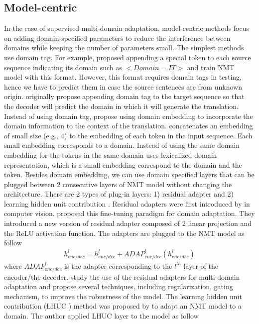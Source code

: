 \subsection{Model-centric}
In the case of supervised multi-domain adaptation, model-centric methods focus on adding domain-specified parameters to reduce the interference between domains while keeping the number of parameters small. The simplest methods use domain tag. For example, \citet{Kobus17domain} proposed appending a special token to each source sequence indicating its domain such as $<Domain=IT>$ and train NMT model with this format. However, this format requires domain tags in testing, hence we have to predict them in case the source sentences are from unknown origin. \cite{Britz17effective} originally propose appending domain tag to the target sequence so that the decoder will predict the domain in which it will generate the translation. Instead of using domain tag, \citep{Kobus17domain, Pham19generic} propose using domain embedding to incorporate the domain information to the context of the translation. \citet{Kobus17domain} concatenates an embedding of small size (e.g., 4) to the embedding of each token in the input sequence. Each small embedding corresponds to a domain. Instead of using the same domain embedding for the tokens in the same domain \citet{Pham19generic} uses lexicalized domain representation, which is a small embedding correspond to the domain and the token. Besides domain embedding, we can use domain specified layers that can be plugged between 2 consecutive layers of NMT model without changing the architecture. There are 2 types of plug-in layers: 1) residual adapter \citep{Bapna19simple, Pham20Study} and 2) learning hidden unit contribution \citep{Vilar18learning}. Residual adapters were first introduced by \citet{Rebuffi17learning} in computer vision. \citet{Bapna19simple} proposed this fine-tuning paradigm for domain adaptation. They introduced a new version of residual adapter composed of 2 linear projection and the ReLU activation function. The adapters are plugged to the NMT model as follow
\begin{equation}
\begin{array}{rcl}
h_{enc/dec}^l = h_{enc/dec}^{l} + ADAP_{enc/dec}^l(h_{enc/dec}^{l})
\end{array}
\end{equation}
where $ADAP_{enc/dec}^l$ is the adapter corresponding to the $l^{th}$ layer of the encoder/the decoder. \cite{Pham20Study} study the use of the residual adapters for multi-domain adaptation and propose several techniques, including regularization, gating mechanism, to improve the robustness of the model. The learning hidden unit contribution (LHUC ) method was proposed by \cite{Vilar18learning} to adapt an NMT model to a domain. The author applied LHUC layer to the model as follow
